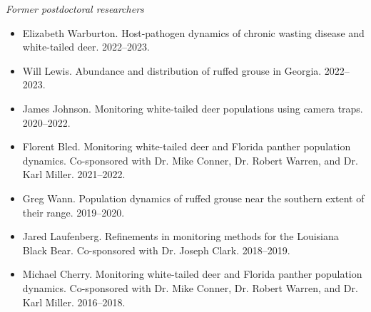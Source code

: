 \documentclass[12pt]{article}
\begin{document}
{\it Former postdoctoral researchers}
\begin{itemize}
   \item Elizabeth Warburton. Host-pathogen dynamics of chronic
     wasting disease and white-tailed deer. 2022--2023. 
   \item Will Lewis. Abundance and distribution of ruffed grouse in
     Georgia. 2022--2023.
   \item James Johnson. Monitoring white-tailed deer
     populations using camera traps. 2020--2022. 
   \item Florent Bled. Monitoring white-tailed deer and Florida panther
     population dynamics. Co-sponsored with Dr. Mike Conner,
     Dr. Robert Warren, and Dr. Karl Miller. 2021--2022. 
   \item Greg Wann. Population dynamics of ruffed grouse near the
     southern extent of their range. 2019--2020. 
   \item Jared Laufenberg. Refinements in
     monitoring methods for the Louisiana Black Bear. Co-sponsored
     with Dr. Joseph Clark.  2018--2019. 
   \item Michael Cherry. Monitoring white-tailed deer and Florida panther
     population dynamics. Co-sponsored with Dr. Mike Conner,
     Dr. Robert Warren, and Dr. Karl Miller. 2016--2018. 
\end{itemize}


\end{document}
